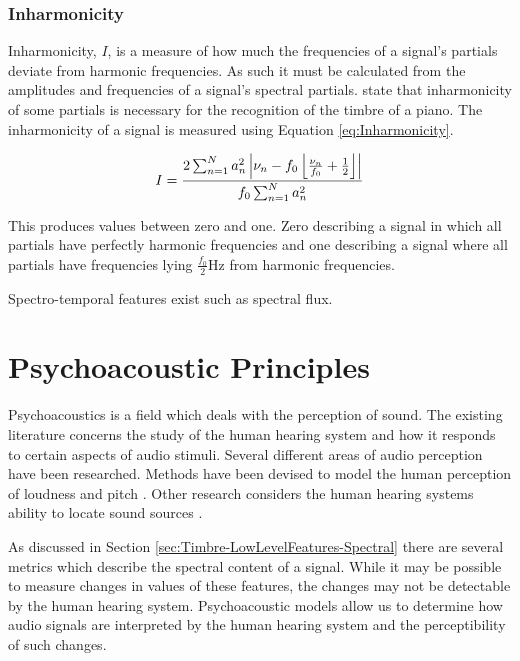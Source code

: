		\subsubsection*{Inharmonicity}
			Inharmonicity, $I$, is a measure of how much the frequencies of a signal's partials deviate from
			harmonic frequencies. As such it must be calculated from the amplitudes and frequencies of a
			signal's spectral partials. \citet{fletcher1962quality} state that inharmonicity of some partials
			is necessary for the recognition of the timbre of a piano. The inharmonicity of a signal is
			measured using Equation \ref{eq:Inharmonicity}.
			
			\begin{equation}
				I = \frac{2\sum_{n = 1}^{N}a_{n}^{2}
					   \left|\nu_{n} - f_{0}\left\lfloor\frac{\nu_{n}}{f_{0}} + \frac{1}{2}\right\rfloor\right|}
					   {f_{0}\sum_{n = 1}^{N} a_{n}^{2}}
				\label{eq:Inharmonicity}
			\end{equation}

			This produces values between zero and one. Zero describing a signal in which all partials have
			perfectly harmonic frequencies and one describing a signal where all partials have frequencies
			lying $\frac{f_{0}}{2}$Hz from harmonic frequencies.

		\note
		{
			Spectro-temporal features exist such as spectral flux.
		}

\section{Psychoacoustic Principles}
\label{sec:Timbre-PsychoacousticPrinciples}
	Psychoacoustics is a field which deals with the perception of sound. The existing literature concerns the study of
	the human hearing system and how it responds to certain aspects of audio stimuli. Several different areas of audio
	perception have been researched. Methods have been devised to model the human perception of loudness
	\citep{moore1997a} and pitch \citep{gerhard2003pitch}. Other research considers the human hearing systems ability
	to locate sound sources \citep{blauert1997spatial}. 

	As discussed in Section \ref{sec:Timbre-LowLevelFeatures-Spectral} there are several metrics which describe the
	spectral content of a signal. While it may be possible to measure changes in values of these features, the changes
	may not be detectable by the human hearing system. Psychoacoustic models allow us to determine how audio signals
	are interpreted by the human hearing system and the perceptibility of such changes.

